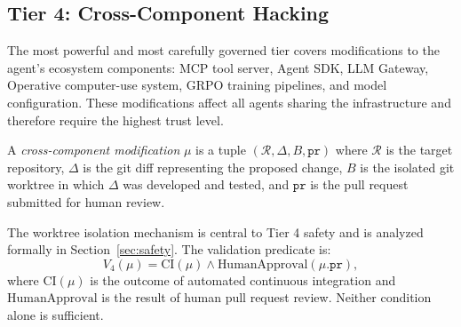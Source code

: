 \subsection{Tier 4: Cross-Component Hacking}
\label{sec:tier4}

The most powerful and most carefully governed tier covers modifications to the
agent's ecosystem components: MCP tool server, Agent SDK, LLM Gateway, Operative
computer-use system, GRPO training pipelines, and model configuration. These
modifications affect all agents sharing the infrastructure and therefore require
the highest trust level.

\begin{definition}
A \emph{cross-component modification} $\mu$ is a tuple
$(\mathcal{R}, \Delta, B, \texttt{pr})$ where $\mathcal{R}$ is the target
repository, $\Delta$ is the git diff representing the proposed change, $B$ is
the isolated git worktree in which $\Delta$ was developed and tested, and
$\texttt{pr}$ is the pull request submitted for human review.
\end{definition}

The worktree isolation mechanism is central to Tier 4 safety and is analyzed
formally in Section~\ref{sec:safety}. The validation predicate is:
\begin{equation}
    V_4(\mu) = \text{CI}(\mu) \wedge \text{HumanApproval}(\mu.\texttt{pr}),
\end{equation}
where $\text{CI}(\mu)$ is the outcome of automated continuous integration and
$\text{HumanApproval}$ is the result of human pull request review. Neither
condition alone is sufficient.

